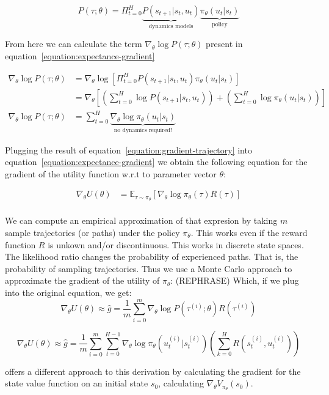 \documentclass{../main.tex}{}
\begin{document}
\begin{equation}
P (\tau; \theta) = \Pi_{t=0}^{H} \underbrace{P (s_{t+1} | s_t, u_t)}_\textrm{dynamics models} \underbrace{\pi_{\theta} (u_t | s_t)}_\textrm{policy}
\end{equation}

From here we can calculate the term $\nabla_{\theta} \log P(\tau ; \theta)$ present in equation~\ref{equation:expectance-gradient}

\begin{equation}\label{equation:gradient-trajectory}
\begin{aligned}
\nabla_{\theta} \log P(\tau ; \theta) & = \nabla_{\theta} \log [\Pi_{t=0}^{H} P(s_{t+1} | s_t, u_t) \pi_{\theta}(u_t | s_t)] \\
 & = \nabla_{\theta} [(\sum_{t=0}^{H} \log P(s_{t+1} | s_t, u_t)) + (\sum_{t=0}^{H} \log \pi_{\theta}(u_t | s_t))] \\ 
 \nabla_{\theta} \log P(\tau ; \theta)& = \sum_{t=0}^{H} \underbrace{\nabla_{\theta} \log \pi_{\theta}(u_t | s_t)}_\textrm{no dynamics required!}
\end{aligned}
\end{equation}

Plugging the result of equation~\ref{equation:gradient-trajectory} into equation~\ref{equation:expectance-gradient} we obtain the following equation for the gradient of the utility function w.r.t to parameter vector $\theta$:

\begin{equation}
\begin{aligned}
\nabla_{\theta} U(\theta) & = \mathbb{E}_{\tau \sim \pi_{\theta}} [\nabla_{\theta} \log \pi_{\theta}(\tau) R(\tau)] \\
\end{aligned}
\end{equation}

We can compute an empirical approximation of that expresion by taking $m$ sample trajectories (or paths) under the policy $\pi_{\theta}$. This works even if the reward function $R$ is unkown and/or discontinuous. This works in discrete state spaces. The likelihood ratio changes the probability of experienced paths. That is, the probability of sampling trajectories. Thus we use a Monte Carlo approach to approximate the gradient of the utility of $\pi_{\theta}$: (REPHRASE)
Which, if we plug into the original equation, we get:
\begin{equation}\label{equation:expectance-gradient-vanilla}
\nabla_{\theta}U(\theta) \approx \hat{g} = \frac{1}{m} \sum_{i = 0}^{m} \nabla_{\theta} \log P(\tau^{(i)} ; \theta) R(\tau^{(i)})
\end{equation}

\begin{equation}
\nabla_{\theta}U(\theta) \approx \hat{g} = \frac{1}{m} \sum_{i = 0}^{m} \sum_{t=0}^{H-1} \nabla_{\theta} \log \pi_{\theta}(u_t^{(i)} | s_t^{(i)}) (\sum_{k=0}^{H}R(s_t^{(i)}, u_t^{(i)}))
\end{equation}

\cite{Sutton1999} offers a different approach to this derivation by calculating the gradient for the state value function on an initial state $s_0$, calculating $\nabla_{\theta} V_{\pi_{\theta}}(s_0)$.
\end{document}
